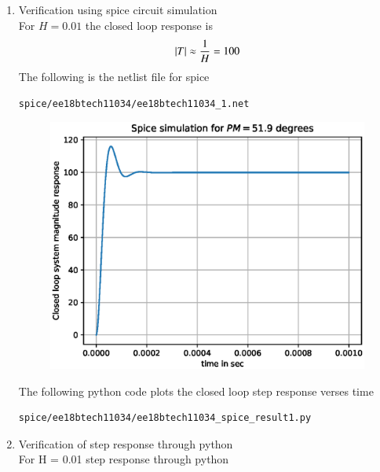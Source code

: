 \begin{enumerate}[label=\arabic*.,ref=\theenumi]
\item Verification using spice circuit simulation\\
\solution For $H=0.01$ the closed loop response is
\begin{align}
\left\vert T\right\vert \approx \frac{1}{H} = 100
\end{align}
The following is the netlist file for spice
\begin{lstlisting}
spice/ee18btech11034/ee18btech11034_1.net
\end{lstlisting}
\begin{figure}[!h]
\centering
\includegraphics[width=\columnwidth]{./figs/ee18btech11034/ee18btech11034_spice_result1.eps}
\caption{}
\label{fig:ee18btech11034_spice_result1}
\end{figure}
The following python code plots the closed loop step response verses time
\begin{lstlisting}
spice/ee18btech11034/ee18btech11034_spice_result1.py
\end{lstlisting}
%
\item Verification of step response through python
\\
\solution For H = 0.01 step response through python
\begin{figure}[!h]
\centering

\end{figure}
\end{enumerate}
